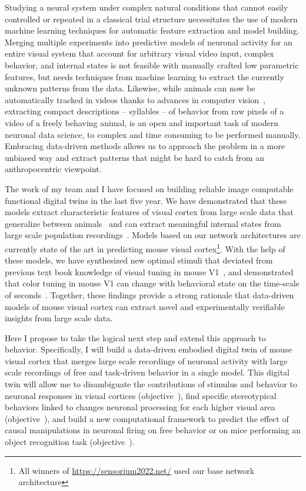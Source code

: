 \documentclass[COG,11pt]{ercgrant}
\begin{document}
Studying a neural system under complex natural conditions that cannot easily controlled or repeated in a classical trial structure necessitates the use of modern machine learning techniques for automatic feature extraction and model building. Merging multiple experiments into predictive models of neuronal activity for an entire visual system that account for arbitrary visual video input, complex behavior, and internal states is not feasible with manually crafted low parametric features, but needs techniques from machine learning to extract the currently unknown patterns from the data. Likewise, while animals can now be automatically tracked in videos thanks to advances in computer vision~\parencite{Mathis2018-lk}, extracting compact descriptions -- syllables -- of behavior from raw pixels of a video of a freely behaving animal, is an open and important task of modern neuronal data science, to complex and time consuming to be performed manually. Embracing data-driven methods allows us to approach the problem in a more unbiased way and extract patterns that might be hard to catch from an anthropocentric viewpoint. 

The work of my team and I have focused on building reliable image computable functional digital  twins in the last five year. We have demonstrated that these models extract characteristic features of visual cortex from large scale data that generalize between animals~\parencite{Sinz2018-sk,Lurz2020-ua,Cobos2022-rr} and can extract meaningful internal states from large scale population recordings~\parencite{Bashiri2021-or}. 
Models based on our network architectures are currently state of the art in predicting mouse visual cortex\footnote{All winners of  \url{https://sensorium2022.net/} used our base network architecture}. 
With the help of these models, we have synthesized new optimal stimuli that deviated from previous text book knowledge of visual tuning in mouse V1~\parencite{Walker2019-yw}, and demonstrated that color tuning in mouse V1 can change with behavioral state on the time-scale of seconds~\parencite{Franke2022-do}. Together, these findings provide a strong rationale that data-driven models of mouse visual cortex can extract novel and experimentally verifiable insights from large scale data. 

Here I propose to take the logical next step and extend this approach to behavior. 
Specifically, I will build a data-driven embodied digital twin of mouse visual cortex that merges large scale recordings of neuronal activity with large scale recordings of free and task-driven behavior in a single model. 
This digital twin will allow me to  disambiguate the contributions of stimulus and behavior to neuronal responses in visual cortices (objective~\obji),  find specific stereotypical behaviors linked to changes neuronal processing for each higher visual area (objective~\objii), and  build a new computational framework to predict the effect of causal manipulations in neuronal firing on free behavior or on mice performing an object recognition task (objective~\objiii). 
\end{document}
